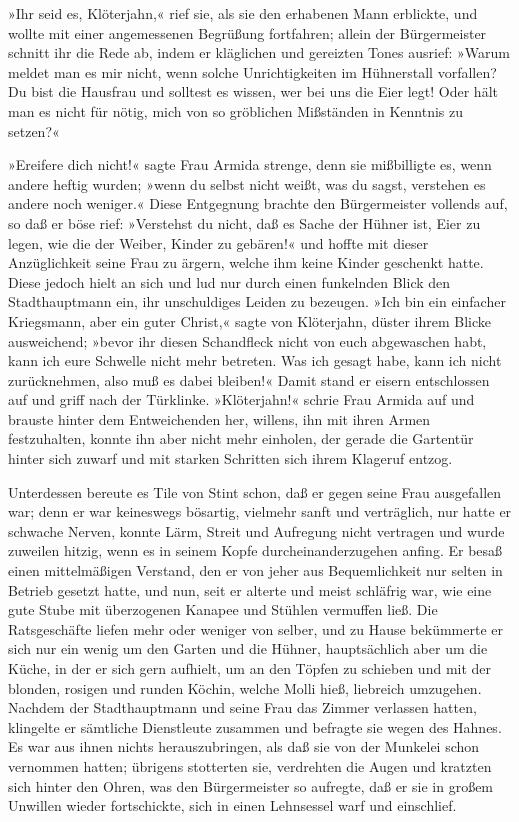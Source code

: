 »Ihr seid es, Klöterjahn,« rief sie, als sie den erhabenen Mann
erblickte, und wollte mit einer angemessenen Begrüßung fortfahren;
allein der Bürgermeister schnitt ihr die Rede ab, indem er
kläglichen und gereizten Tones ausrief: »Warum meldet man es mir
nicht, wenn solche Unrichtigkeiten im Hühnerstall vorfallen? Du
bist die Hausfrau und solltest es wissen, wer bei uns die Eier
legt! Oder hält man es nicht für nötig, mich von so gröblichen
Mißständen in Kenntnis zu setzen?«

»Ereifere dich nicht!« sagte Frau Armida strenge, denn sie
mißbilligte es, wenn andere heftig wurden; »wenn du selbst nicht
weißt, was du sagst, verstehen es andere noch weniger.« Diese
Entgegnung brachte den Bürgermeister vollends auf, so daß er böse
rief: »Verstehst du nicht, daß es Sache der Hühner ist, Eier zu
legen, wie die der Weiber, Kinder zu gebären!« und hoffte mit
dieser Anzüglichkeit seine Frau zu ärgern, welche ihm keine Kinder
geschenkt hatte. Diese jedoch hielt an sich und lud nur durch einen
funkelnden Blick den Stadthauptmann ein, ihr unschuldiges Leiden zu
bezeugen. »Ich bin ein einfacher Kriegsmann, aber ein guter
Christ,« sagte von Klöterjahn, düster ihrem Blicke ausweichend;
»bevor ihr diesen Schandfleck nicht von euch abgewaschen habt, kann
ich eure Schwelle nicht mehr betreten. Was ich gesagt habe, kann
ich nicht zurücknehmen, also muß es dabei bleiben!« Damit stand er
eisern entschlossen auf und griff nach der Türklinke. »Klöterjahn!«
schrie Frau Armida auf und brauste hinter dem Entweichenden her,
willens, ihn mit ihren Armen festzuhalten, konnte ihn aber nicht
mehr einholen, der gerade die Gartentür\pagenum{[13]} hinter sich
zuwarf und mit starken Schritten sich ihrem Klageruf entzog.

Unterdessen bereute es Tile von Stint schon, daß er gegen seine
Frau ausgefallen war; denn er war keineswegs bösartig, vielmehr
sanft und verträglich, nur hatte er schwache Nerven, konnte Lärm,
Streit und Aufregung nicht vertragen und wurde zuweilen hitzig,
wenn es in seinem Kopfe durcheinanderzugehen anfing. Er besaß einen
mittelmäßigen Verstand, den er von jeher aus Bequemlichkeit nur
selten in Betrieb gesetzt hatte, und nun, seit er alterte und meist
schläfrig war, wie eine gute Stube mit überzogenen Kanapee und
Stühlen vermuffen ließ. Die Ratsgeschäfte liefen mehr oder weniger
von selber, und zu Hause bekümmerte er sich nur ein wenig um den
Garten und die Hühner, hauptsächlich aber um die Küche, in der er
sich gern aufhielt, um an den Töpfen zu schieben und mit der
blonden, rosigen und runden Köchin, welche Molli hieß, liebreich
umzugehen. Nachdem der Stadthauptmann und seine Frau das Zimmer
verlassen hatten, klingelte er sämtliche Dienstleute zusammen und
befragte sie wegen des Hahnes. Es war aus ihnen nichts
herauszubringen, als daß sie von der Munkelei schon vernommen
hatten; übrigens stotterten sie, verdrehten die Augen und kratzten
sich hinter den Ohren, was den Bürgermeister so aufregte, daß er
sie in großem Unwillen wieder fortschickte, sich in einen
Lehnsessel warf und einschlief.

